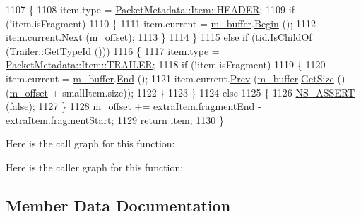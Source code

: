 \begin{DoxyCode}
1107     \{
1108       item.type = \hyperlink{structns3_1_1PacketMetadata_1_1Item_ab0a06781a8793079afeab58a9a9b3174a35a76b7dc57ca42587ecfb5f81f1bcb2}{PacketMetadata::Item::HEADER};
1109       \textcolor{keywordflow}{if} (!item.isFragment)
1110         \{
1111           item.current = \hyperlink{classns3_1_1PacketMetadata_1_1ItemIterator_a28a05c78e0009cfda77bc74d3eefb30e}{m\_buffer}.\hyperlink{classns3_1_1Buffer_a893d4bf50df13e730b6cd0fda91b967f}{Begin} ();
1112           item.current.\hyperlink{classns3_1_1Buffer_1_1Iterator_a5eaa564bdc98d063b7e94b1768aeed6b}{Next} (\hyperlink{classns3_1_1PacketMetadata_1_1ItemIterator_aa1970b36f1f272fd758b68eea35339a3}{m\_offset});
1113         \}
1114     \}
1115   \textcolor{keywordflow}{else} \textcolor{keywordflow}{if} (tid.IsChildOf (\hyperlink{classns3_1_1Trailer_a93dd50665201460721fa5722d583f34f}{Trailer::GetTypeId} ()))
1116     \{
1117       item.type = \hyperlink{structns3_1_1PacketMetadata_1_1Item_ab0a06781a8793079afeab58a9a9b3174ab32282a2f84adad5e57549c03179ff45}{PacketMetadata::Item::TRAILER};
1118       \textcolor{keywordflow}{if} (!item.isFragment)
1119         \{
1120           item.current = \hyperlink{classns3_1_1PacketMetadata_1_1ItemIterator_a28a05c78e0009cfda77bc74d3eefb30e}{m\_buffer}.\hyperlink{classns3_1_1Buffer_a52207c7aed7bae89fba2f9e997c82724}{End} ();
1121           item.current.\hyperlink{classns3_1_1Buffer_1_1Iterator_a9913fb3b506a9f6efe46060531f051d8}{Prev} (\hyperlink{classns3_1_1PacketMetadata_1_1ItemIterator_a28a05c78e0009cfda77bc74d3eefb30e}{m\_buffer}.\hyperlink{classns3_1_1Buffer_a3047b8f2dad303c6370695122f1884f0}{GetSize} () - (\hyperlink{classns3_1_1PacketMetadata_1_1ItemIterator_aa1970b36f1f272fd758b68eea35339a3}{m\_offset} + smallItem.size));
1122         \}
1123     \}
1124   \textcolor{keywordflow}{else} 
1125     \{
1126       \hyperlink{assert_8h_a6dccdb0de9b252f60088ce281c49d052}{NS\_ASSERT} (\textcolor{keyword}{false});
1127     \}
1128   \hyperlink{classns3_1_1PacketMetadata_1_1ItemIterator_aa1970b36f1f272fd758b68eea35339a3}{m\_offset} += extraItem.fragmentEnd - extraItem.fragmentStart;
1129   \textcolor{keywordflow}{return} item;
1130 \}
\end{DoxyCode}


Here is the call graph for this function\+:




Here is the caller graph for this function\+:




\subsection{Member Data Documentation}
